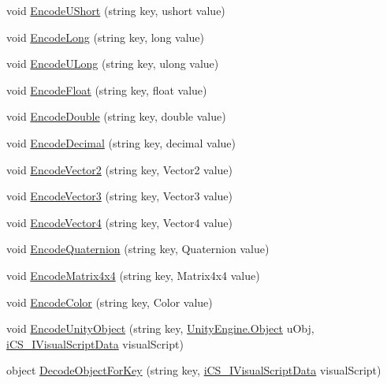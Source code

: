 \begin{DoxyCompactItemize}
\item 
void \hyperlink{classi_c_s___coder_ab79929b0771bad7b1afae045fa6735fa}{Encode\+U\+Short} (string key, ushort value)
\item 
void \hyperlink{classi_c_s___coder_a790a63d8fe07b54ea60f920db9897a0a}{Encode\+Long} (string key, long value)
\item 
void \hyperlink{classi_c_s___coder_ae803460a312cae316365980c2f0ee6f0}{Encode\+U\+Long} (string key, ulong value)
\item 
void \hyperlink{classi_c_s___coder_a0f367a95a0e63afe1399d1ae397c08a9}{Encode\+Float} (string key, float value)
\item 
void \hyperlink{classi_c_s___coder_acf8ca0f29510d06c1d98bc1717777475}{Encode\+Double} (string key, double value)
\item 
void \hyperlink{classi_c_s___coder_a30722d7dd52fbcc6d67e1abf4204323c}{Encode\+Decimal} (string key, decimal value)
\item 
void \hyperlink{classi_c_s___coder_ac7ca17c3ed5231be52f0ae27f1acbe38}{Encode\+Vector2} (string key, Vector2 value)
\item 
void \hyperlink{classi_c_s___coder_a676590eb026acf9e0c616646144b6a32}{Encode\+Vector3} (string key, Vector3 value)
\item 
void \hyperlink{classi_c_s___coder_aa1cd7e345c427014cdc7ddd0d1e70f34}{Encode\+Vector4} (string key, Vector4 value)
\item 
void \hyperlink{classi_c_s___coder_a2b29718bd39f8764e3c9017aa0473ea2}{Encode\+Quaternion} (string key, Quaternion value)
\item 
void \hyperlink{classi_c_s___coder_aa6ff0b8bf9cf47651182d4c7253421ee}{Encode\+Matrix4x4} (string key, Matrix4x4 value)
\item 
void \hyperlink{classi_c_s___coder_a5602db6916bb55f2de7391f938c76de1}{Encode\+Color} (string key, Color value)
\item 
void \hyperlink{classi_c_s___coder_aa55a7bf4818b1d44b83683b8243ea8ed}{Encode\+Unity\+Object} (string key, \hyperlink{i_c_s___logic_8cs_a5b2c8b05b9a357906d7f9e5b2c1e154d}{Unity\+Engine.\+Object} u\+Obj, \hyperlink{interfacei_c_s___i_visual_script_data}{i\+C\+S\+\_\+\+I\+Visual\+Script\+Data} visual\+Script)
\item 
object \hyperlink{classi_c_s___coder_a106f17488b9e65a43c184e362cd772ae}{Decode\+Object\+For\+Key} (string key, \hyperlink{interfacei_c_s___i_visual_script_data}{i\+C\+S\+\_\+\+I\+Visual\+Script\+Data} visual\+Script)
\item 

\end{DoxyCompactItemize}
